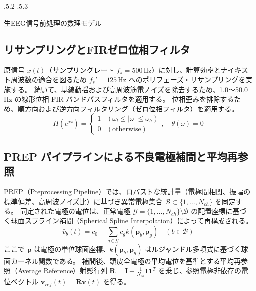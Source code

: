 \documentclass[platex,dvipdfmx,12pt]{jsarticle}
\makeatletter
\renewcommand{\section}{%
  \clearpage
  \@startsection{section}{1}{\z@}%
  {\Cvs \@plus.5\Cdp \@minus.2\Cdp}%
  {.5\Cvs \@plus.3\Cdp}%
  {\normalfont\LARGE\headfont\raggedright}%
}
\makeatother
\begin{document}
\section{生EEG信号前処理の数理モデル}

\subsection{リサンプリングとFIRゼロ位相フィルタ}
原信号 $x(t)$（サンプリングレート $f_s = 500\,\text{Hz}$）に対し、計算効率とナイキスト周波数の適合を図るため $f_s' = 125\,\text{Hz}$ へのポリフェーズ・リサンプリングを実施する。
続いて、基線動揺および高周波筋電ノイズを除去するため、1.0〜50.0 Hz の線形位相 FIR バンドパスフィルタを適用する。
位相歪みを排除するため、順方向および逆方向フィルタリング（ゼロ位相フィルタ）を適用する。
\begin{equation}
  H(e^{j\omega}) = \begin{cases}
    1 & (\omega_l \le |\omega| \le \omega_h) \\
    0 & (\text{otherwise})
  \end{cases}, \quad \theta(\omega) = 0
  \label{eq:zero_phase_filter}
\end{equation}

\subsection{PREP パイプラインによる不良電極補間と平均再参照}
PREP（Preprocessing Pipeline）\cite{bigdely2015prep}では、ロバストな統計量（電極間相関、振幅の標準偏差、高周波ノイズ比）に基づき異常電極集合 $\mathcal{B} \subset \{1, \dots, N_{ch}\}$ を同定する。
同定された電極の電位は、正常電極 $\mathcal{G} = \{1, \dots, N_{ch}\} \setminus \mathcal{B}$ の配置座標に基づく球面スプライン補間（Spherical Spline Interpolation）によって再構成される。
\begin{equation}
  \hat{v}_b(t) = c_0 + \sum_{g \in \mathcal{G}} c_g k(\mathbf{p}_b, \mathbf{p}_g) \quad (b \in \mathcal{B})
  \label{eq:spherical_spline}
\end{equation}
ここで $\mathbf{p}$ は電極の単位球面座標、$k(\mathbf{p}_b, \mathbf{p}_g)$ はルジャンドル多項式に基づく球面カーネル関数である。
補間後、頭皮全電極の平均電位を基準とする平均再参照（Average Reference）射影行列 $\mathbf{R} = \mathbf{I} - \frac{1}{N_{ch}} \mathbf{1} \mathbf{1}^T$ を乗じ、参照電極非依存の電位ベクトル $\mathbf{v}_{ref}(t) = \mathbf{R} \mathbf{v}(t)$ を得る。
\end{document}

